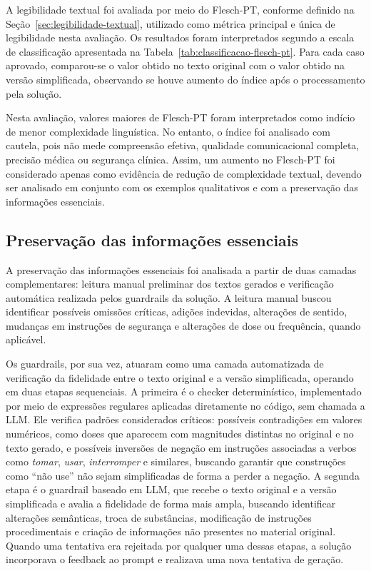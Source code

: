 A legibilidade textual foi avaliada por meio do Flesch-PT, conforme definido na Seção~\ref{sec:legibilidade-textual}, utilizado como métrica principal e única de legibilidade nesta avaliação. Os resultados foram interpretados segundo a escala de classificação apresentada na Tabela~\ref{tab:classificacao-flesch-pt}. Para cada caso aprovado, comparou-se o valor obtido no texto original com o valor obtido na versão simplificada, observando se houve aumento do índice após o processamento pela solução.

Nesta avaliação, valores maiores de Flesch-PT foram interpretados como indício de menor complexidade linguística. No entanto, o índice foi analisado com cautela, pois não mede compreensão efetiva, qualidade comunicacional completa, precisão médica ou segurança clínica. Assim, um aumento no Flesch-PT foi considerado apenas como evidência de redução de complexidade textual, devendo ser analisado em conjunto com os exemplos qualitativos e com a preservação das informações essenciais.

\subsection{Preservação das informações essenciais}
\label{subsec:preservacao-informacoes-essenciais-avaliacao}

A preservação das informações essenciais foi analisada a partir de duas camadas complementares: leitura manual preliminar dos textos gerados e verificação automática realizada pelos guardrails da solução. A leitura manual buscou identificar possíveis omissões críticas, adições indevidas, alterações de sentido, mudanças em instruções de segurança e alterações de dose ou frequência, quando aplicável.

Os guardrails, por sua vez, atuaram como uma camada automatizada de verificação da fidelidade entre o texto original e a versão simplificada, operando em duas etapas sequenciais. A primeira é o checker determinístico, implementado por meio de expressões regulares aplicadas diretamente no código, sem chamada a LLM. Ele verifica padrões considerados críticos: possíveis contradições em valores numéricos, como doses que aparecem com magnitudes distintas no original e no texto gerado, e possíveis inversões de negação em instruções associadas a verbos como \textit{tomar}, \textit{usar}, \textit{interromper} e similares, buscando garantir que construções como ``não use'' não sejam simplificadas de forma a perder a negação. A segunda etapa é o guardrail baseado em LLM, que recebe o texto original e a versão simplificada e avalia a fidelidade de forma mais ampla, buscando identificar alterações semânticas, troca de substâncias, modificação de instruções procedimentais e criação de informações não presentes no material original. Quando uma tentativa era rejeitada por qualquer uma dessas etapas, a solução incorporava o feedback ao prompt e realizava uma nova tentativa de geração.

